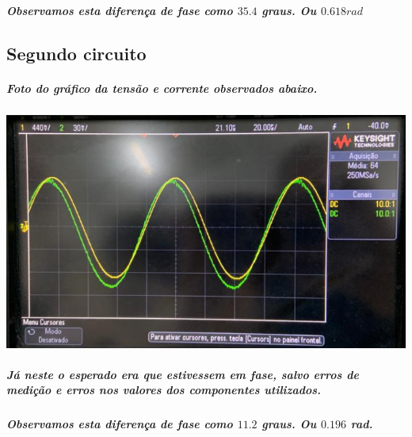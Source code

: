 \documentclass[12pt,twoside, a4paper, twocolumn]{article}
\begin{document}
\subparagraph*{Observamos esta diferença de fase como $35.4$ graus. Ou $0.618rad$}



\subsection*{Segundo circuito}
\subparagraph*{Foto do gráfico da tensão e corrente observados abaixo.}
\subparagraph*{}
\begin{adjustbox}{scale=0.3}
    \includegraphics{circuito2.png}
\end{adjustbox}

\subparagraph*{Já neste o esperado era que estivessem em fase, salvo erros de medição e erros nos valores dos componentes utilizados.}

\subparagraph*{Observamos esta diferença de fase como $11.2$ graus. Ou $0.196$ rad.}
\end{document}
